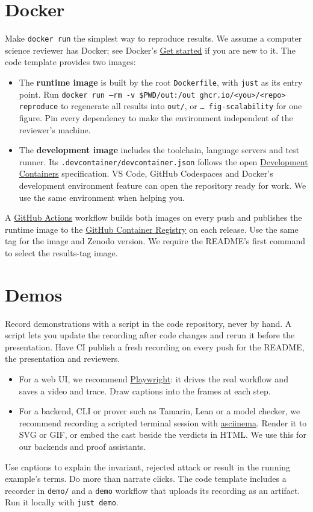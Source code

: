 \section{Docker}\label{app:code:docker}
Make \texttt{docker run} the simplest way to reproduce results. We assume a computer science reviewer has Docker; see Docker's \href{https://docs.docker.com/get-started/}{Get started} if you are new to it. The code template provides two images:
\begin{itemize}[noitemsep]
  \item The \textbf{runtime image} is built by the root \texttt{Dockerfile}, with \texttt{just} as its entry point. Run \texttt{docker run --rm -v \$PWD/out:/out ghcr.io/<you>/<repo> reproduce} to regenerate all results into \texttt{out/}, or \texttt{\dots{} fig-scalability} for one figure. Pin every dependency to make the environment independent of the reviewer's machine.
  \item The \textbf{development image} includes the toolchain, language servers and test runner. Its \texttt{.devcontainer/devcontainer.json} follows the open \href{https://containers.dev/}{Development Containers} specification. VS Code, GitHub Codespaces and Docker's development environment feature can open the repository ready for work. We use the same environment when helping you.
\end{itemize}
A \href{https://docs.github.com/en/actions}{GitHub Actions} workflow builds both images on every push and publishes the runtime image to the \href{https://docs.github.com/en/packages/working-with-a-github-packages-registry/working-with-the-container-registry}{GitHub Container Registry} on each release. Use the same tag for the image and Zenodo version. We require the README's first command to select the results-tag image.

\section{Demos}\label{app:code:demo}
Record demonstrations with a script in the code repository, never by hand. A script lets you update the recording after code changes and rerun it before the presentation. Have CI publish a fresh recording on every push for the README, the presentation and reviewers.
\begin{itemize}[noitemsep]
  \item For a web UI, we recommend \href{https://playwright.dev/}{Playwright}: it drives the real workflow and saves a video and trace. Draw captions into the frames at each step.
  \item For a backend, CLI or prover such as Tamarin, Lean or a model checker, we recommend recording a scripted terminal session with \href{https://asciinema.org/}{asciinema}. Render it to SVG or GIF, or embed the cast beside the verdicts in HTML. We use this for our backends and proof assistants.
\end{itemize}
Use captions to explain the invariant, rejected attack or result in the running example's terms. Do more than narrate clicks. The code template includes a recorder in \texttt{demo/} and a \texttt{demo} workflow that uploads its recording as an artifact. Run it locally with \texttt{just demo}.

